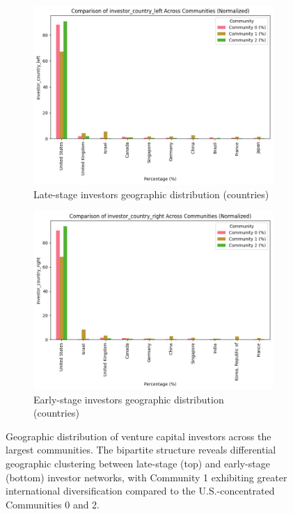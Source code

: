 
\begin{figure}[htp]
\centering
\begin{subfigure}{0.8\textwidth}
    \centering
    \includegraphics[width=1\textwidth]{./assets/investor-left-countries.png}
    \caption{Late-stage investors geographic distribution (countries)}
    \label{fig:late_stage_geo}
\end{subfigure}

\vspace{0.5em}

\begin{subfigure}{0.8\textwidth}
    \centering
    \includegraphics[width=1\textwidth]{./assets/investor-right-countries.png}
    \caption{Early-stage investors geographic distribution (countries)}
    \label{fig:early_stage_geo}
\end{subfigure}
\caption{Geographic distribution of venture capital investors across the largest communities. The bipartite structure reveals differential geographic clustering between late-stage (top) and early-stage (bottom) investor networks, with Community 1 exhibiting greater international diversification compared to the U.S.-concentrated Communities 0 and 2.}
\label{fig:geographic_distribution}
\end{figure}

